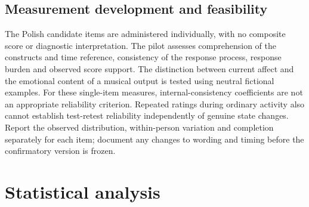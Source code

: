 \documentclass[11pt]{article}
\begin{document}
\subsection{Measurement development and feasibility}
The Polish candidate items are administered individually, with no composite score or diagnostic interpretation. The pilot assesses comprehension of the constructs and time reference, consistency of the response process, response burden and observed score support. The distinction between current affect and the emotional content of a musical output is tested using neutral fictional examples. For these single-item measures, internal-consistency coefficients are not an appropriate reliability criterion. Repeated ratings during ordinary activity also cannot establish test-retest reliability independently of genuine state changes. Report the observed distribution, within-person variation and completion separately for each item; document any changes to wording and timing before the confirmatory version is frozen.

\section{Statistical analysis}
\end{document}
